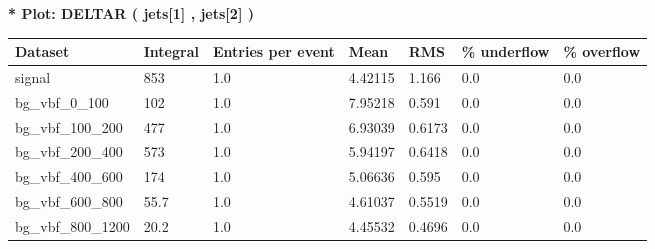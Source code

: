 \documentclass[a4paper, 10pt]{article}
\begin{document}
\textbf{* Plot: DELTAR ( jets[1] , jets[2] ) }\\
   \begin{table}[H]
  \begin{center}
    \begin{tabular}{|m{23.0mm}|m{23.0mm}|m{18.0mm}|m{19.0mm}|m{19.0mm}|m{19.0mm}|m{19.0mm}|}
      \hline
      {\cellcolor{yellow}         Dataset}& {\cellcolor{yellow}         Integral}& {\cellcolor{yellow}         Entries per event}& {\cellcolor{yellow}         Mean}& {\cellcolor{yellow}         RMS}& {\cellcolor{yellow}         \% underflow}& {\cellcolor{yellow}         \% overflow}\\
      \hline
      {\cellcolor{white}         signal}& {\cellcolor{white}         853}& {\cellcolor{white}         1.0}& {\cellcolor{white}         4.42115}& {\cellcolor{white}         1.166}& {\cellcolor{green}         0.0}& {\cellcolor{green}         0.0}\\
      \hline
      {\cellcolor{white}         bg\_vbf\_0\_100}& {\cellcolor{white}         102}& {\cellcolor{white}         1.0}& {\cellcolor{white}         7.95218}& {\cellcolor{white}         0.591}& {\cellcolor{green}         0.0}& {\cellcolor{green}         0.0}\\
      \hline
      {\cellcolor{white}         bg\_vbf\_100\_200}& {\cellcolor{white}         477}& {\cellcolor{white}         1.0}& {\cellcolor{white}         6.93039}& {\cellcolor{white}         0.6173}& {\cellcolor{green}         0.0}& {\cellcolor{green}         0.0}\\
      \hline
      {\cellcolor{white}         bg\_vbf\_200\_400}& {\cellcolor{white}         573}& {\cellcolor{white}         1.0}& {\cellcolor{white}         5.94197}& {\cellcolor{white}         0.6418}& {\cellcolor{green}         0.0}& {\cellcolor{green}         0.0}\\
      \hline
      {\cellcolor{white}         bg\_vbf\_400\_600}& {\cellcolor{white}         174}& {\cellcolor{white}         1.0}& {\cellcolor{white}         5.06636}& {\cellcolor{white}         0.595}& {\cellcolor{green}         0.0}& {\cellcolor{green}         0.0}\\
      \hline
      {\cellcolor{white}         bg\_vbf\_600\_800}& {\cellcolor{white}         55.7}& {\cellcolor{white}         1.0}& {\cellcolor{white}         4.61037}& {\cellcolor{white}         0.5519}& {\cellcolor{green}         0.0}& {\cellcolor{green}         0.0}\\
      \hline
      {\cellcolor{white}         bg\_vbf\_800\_1200}& {\cellcolor{white}         20.2}& {\cellcolor{white}         1.0}& {\cellcolor{white}         4.45532}& {\cellcolor{white}         0.4696}& {\cellcolor{green}         0.0}& {\cellcolor{green}         0.0}\\

\end{tabular}
\end{center}
\end{table}
\end{document}
